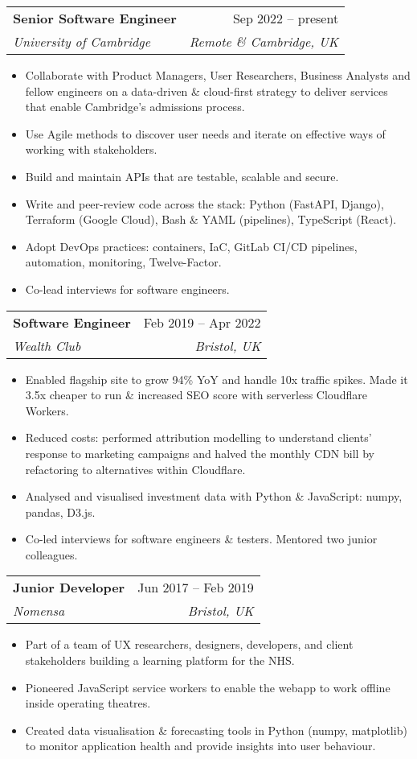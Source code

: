 \documentclass[a4paper,12pt]{article}
\makeatletter
\newcommand{\resumeItem}[1]{
  \item\small{
    {#1 \vspace{-2pt}}
  }
}
\newcommand{\resumeSubheading}[4]{
  \vspace{-2pt}\item
    \begin{tabular*}{0.97\textwidth}[t]{l@{\extracolsep{\fill}}r}
      \textbf{#1} & #2 \\
      \textit{\small#3} & \textit{\small #4} \\
    \end{tabular*}\vspace{-7pt}
}
\newcommand{\resumeItemListStart}{\begin{itemize}}
\newcommand{\resumeItemListEnd}{\end{itemize}\vspace{-5pt}}
\makeatother
\begin{document}
    \resumeSubheading
      {Senior Software Engineer}{Sep 2022 -- present}
      {University of Cambridge}{Remote \& Cambridge, UK}
      \vspace{0pt}
    \resumeItemListStart
        \resumeItem{Collaborate with Product Managers, User Researchers, Business Analysts and fellow engineers on a data-driven \& cloud-first strategy to deliver services that enable Cambridge's admissions process.}
        \resumeItem{Use Agile methods to discover user needs and iterate on effective ways of working with stakeholders.}
        \resumeItem{Build and maintain APIs that are testable, scalable and secure.}
        \resumeItem{Write and peer-review code across the stack: Python (FastAPI, Django), Terraform (Google Cloud), Bash \& YAML (pipelines), TypeScript (React).}
        \resumeItem{Adopt DevOps practices: containers, IaC, GitLab CI/CD pipelines, automation, monitoring, Twelve-Factor.}
        \resumeItem{Co-lead interviews for software engineers.}
    \resumeItemListEnd
      \vspace{4pt}

    \resumeSubheading
      {Software Engineer}{Feb 2019 -- Apr 2022}
      {Wealth Club}{Bristol, UK}
      \vspace{0pt}
    \resumeItemListStart
        \resumeItem{Enabled flagship site to grow 94\% YoY and handle 10x traffic spikes. Made it 3.5x cheaper to run \& increased SEO score with serverless Cloudflare Workers.}
        \resumeItem{Reduced costs: performed attribution modelling to understand clients' response to marketing campaigns and halved the monthly CDN bill by refactoring to alternatives within Cloudflare.}
        \resumeItem{Analysed and visualised investment data with Python \& JavaScript: numpy, pandas, D3.js.}
        \resumeItem{Co-led interviews for software engineers \& testers. Mentored two junior colleagues.}
    \resumeItemListEnd
      \vspace{4pt}

    \resumeSubheading
      {Junior Developer}{Jun 2017 -- Feb 2019}
      {Nomensa}{Bristol, UK}
      \vspace{0pt}
    \resumeItemListStart
        \resumeItem{Part of a team of UX researchers, designers, developers, and client stakeholders building a learning platform for the NHS.}
        \resumeItem{Pioneered JavaScript service workers to enable the webapp to work offline inside operating theatres.}
        \resumeItem{Created data visualisation \& forecasting tools in Python (numpy, matplotlib) to monitor application health and provide insights into user behaviour.}
    \resumeItemListEnd
\end{document}
